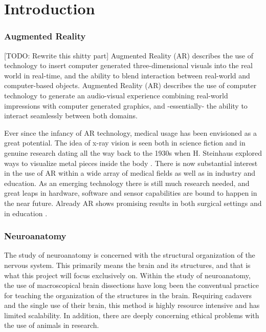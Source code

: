 \chapter{Introduction}


\subsection*{Augmented Reality}


{
    \color{BrickRed}
    [TODO: Rewrite this shitty part]
    Augmented Reality (AR) describes the use of technology to insert computer generated three-dimensional visuals into the real world in real-time, and the ability to blend interaction between real-world and computer-based objects. 
}
Augmented Reality (AR) describes the use of computer technology to generate an audio-visual experience combining real-world impressions with computer generated graphics, and -essentially- the ability to interact seamlessly between both domains.
 

\noindent Ever since the infancy of AR technology, medical usage has been envisioned as a great potential. The idea of x-ray vision is seen both in science fiction and in genuine research dating all the way back to the 1930s when H. Steinhaus explored ways to visualize metal pieces inside the body \citep{Sielhorst2008}. There is now substantial interest in the use of AR within a wide array of medical fields as well as in industry and education. As an emerging technology there is still much research needed, and great leaps in hardware, software and sensor capabilities are bound to happen in the near future. Already AR shows promising results in both surgical settings and in education \citep{Singh2013}.

\subsection*{Neuroanatomy}

The study of neuroanatomy is concerned with the structural organization of the nervous system. This primarily means the brain and its structures, and that is what this project will focus exclusively on.
Within the study of neuroanatomy, the use of macroscopical brain dissections have long been the conventual practice for teaching the organization of the structures in the brain. Requiring cadavers and the single use of their brain, this method is highly resource intensive and has limited scalability. In addition, there are deeply concerning ethical problems with the use of animals in research. 

